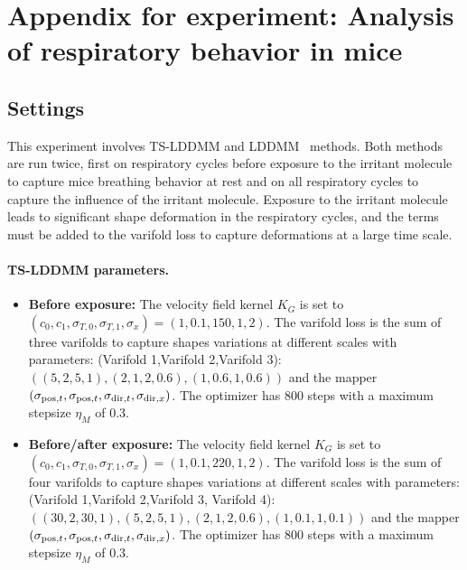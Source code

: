 \section{Appendix for experiment: Analysis of respiratory behavior in mice}
\label{appendix: mice_exp_setting}

\subsection{Settings}

This experiment involves TS-LDDMM and LDDMM~\cite{glaunes2008large} methods. Both methods are run twice, first on respiratory cycles before exposure to the irritant molecule to capture mice breathing behavior at rest and on all respiratory cycles to capture the influence of the irritant molecule. Exposure to the irritant molecule leads to significant shape deformation in the respiratory cycles, and the terms must be added to the varifold loss to capture deformations at a large time scale. 

\paragraph{TS-LDDMM parameters.}
\begin{itemize}
  \item \textbf{Before exposure:} The velocity field kernel $K_G$ is set to $ (c_0,c_1,\sigma_{T,0},\sigma_{T,1},\sigma_x) = (1,0.1,150,1,2)$. The varifold loss is the sum of three varifolds to capture shapes variations at different scales with parameters: (Varifold 1,Varifold 2,Varifold 3): $\left((5,2,5,1),(2,1,2,0.6),(1,0.6,1,0.6)\right)$ and the mapper $(\sigma_{\mathrm{pos},t}, \sigma_{\mathrm{pos},t}, \sigma_{\mathrm{dir},t}, \sigma_{\mathrm{dir},x})$. The optimizer has 800 steps with a maximum stepsize $\eta_M$ of 0.3.
  \item \textbf{Before/after exposure:} The velocity field kernel $K_G$ is set to $ (c_0,c_1,\sigma_{T,0},\sigma_{T,1},\sigma_x) = (1,0.1,220,1,2)$. The varifold loss is the sum of four varifolds to capture shapes variations at different scales with parameters: (Varifold 1,Varifold 2,Varifold 3, Varifold 4): $\left((30,2,30,1),(5,2,5,1),(2,1,2,0.6),(1,0.1,1,0.1)\right)$ and the mapper $(\sigma_{\mathrm{pos},t}, \sigma_{\mathrm{pos},t}, \sigma_{\mathrm{dir},t}, \sigma_{\mathrm{dir},x})$. The optimizer has 800 steps with a maximum stepsize $\eta_M$ of 0.3.
\end{itemize}

